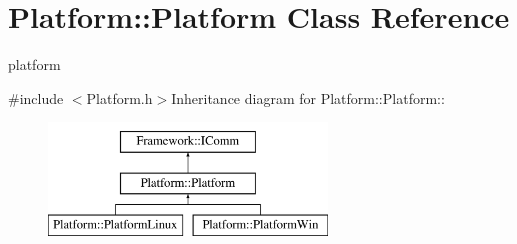 \hypertarget{classPlatform_1_1Platform}{
\section{Platform::Platform Class Reference}
\label{classPlatform_1_1Platform}
}


platform  


{\ttfamily \#include $<$Platform.h$>$}Inheritance diagram for Platform::Platform::\begin{figure}[H]
\begin{center}
\leavevmode
\includegraphics[height=3cm]{classPlatform_1_1Platform}
\end{center}
\end{figure}
